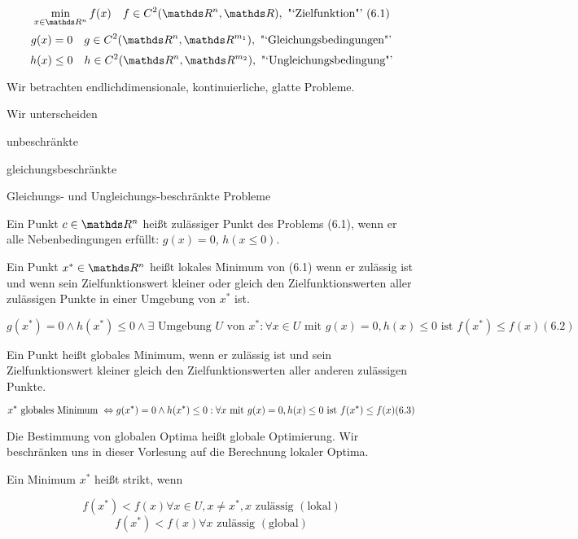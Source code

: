 

\[ \min_{x \in \R^n} f(x) \quad f \in C^2(\R^n, \R), \text{ "`Zielfunktion"' } (6.1) \]
\[ g(x) = 0 \quad g \in C^2(\R^n, \R^{m_1}), \text{ "`Gleichungsbedingungen"'} \]
\[ h(x) \leq 0 \quad h \in C^2(\R^n, \R^{m_2}), \text{ "`Ungleichungsbedingung"'} \]

Wir betrachten endlichdimensionale, kontinuierliche, glatte Probleme.

Wir unterscheiden

\bitm
\item unbeschränkte 
\item gleichungsbeschränkte
\item Gleichungs- und Ungleichungs-beschränkte Probleme
\eitm


Ein Punkt $c \in \R^n$ heißt zulässiger Punkt des Problems (6.1), wenn er alle Nebenbedingungen erfüllt: $g(x) = 0$, $h(x \leq 0)$.


Ein Punkt $x^* \in \R^n$ heißt lokales Minimum von (6.1) wenn er zulässig ist und wenn sein Zielfunktionswert kleiner oder gleich den Zielfunktionswerten aller zulässigen Punkte in einer Umgebung von $x^*$ ist.

\[ g(x^*) = 0 \wedge h(x^*) \leq 0 \wedge \exists \text{ Umgebung } U \text{ von } x^*: \forall x \in U \text{ mit } g(x) = 0, h(x) \leq 0 \text{ ist } f(x^*) \leq f(x) (6.2) \]


Ein Punkt heißt globales Minimum, wenn er zulässig ist und sein Zielfunktionswert kleiner gleich den Zielfunktionswerten aller anderen zulässigen Punkte.

\[ x^* \text{ globales Minimum } \Leftrightarrow g(x^*) = 0 \wedge h(x^*) \leq 0: \forall x \text{ mit } g(x) = 0, h(x) \leq 0 \text{ ist } f(x^*) \leq f(x) (6.3) \]

Die Bestimmung von globalen Optima heißt globale Optimierung. Wir beschränken uns in dieser Vorlesung auf die Berechnung lokaler Optima.


Ein Minimum $x^*$ heißt strikt, wenn

\[ f(x^*) < f(x) \forall x \in U, x \neq x^*, x \text{ zulässig } (\text{lokal}) \]
\[ f(x^*) < f(x) \forall x \text{ zulässig } (\text{global}) \]

